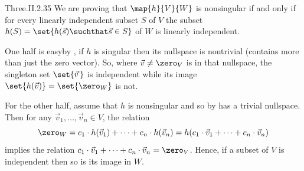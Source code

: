 \begin{ans}{Three.II.2.35}
      We are proving that \( \map{h}{V}{W} \) is nonsingular if and only
      if for every linearly independent subset \( S \) of \( V \) the subset
      \( h(S)=\set{h(\vec{s})\suchthat \vec{s}\in S} \) of \( W \) is linearly
      independent.

      One half is easy\Dash by ,
      if \( h \) is singular then its nullspace is
      nontrivial (contains more than just the zero vector).
      So,
      where \( \vec{v}\neq\zero_V \) is in that nullspace, the singleton set
      \( \set{\vec{v\,}} \) is independent while its image
      \( \set{h(\vec{v})}=\set{\zero_W} \) is not.

      For the other half,
      assume that \( h \) is nonsingular and so by
       has a trivial nullspace.
      Then for any \( \vec{v}_1,\dots,\vec{v}_n\in V \), the relation
      \begin{equation*}
        \zero_W=
        c_1\cdot h(\vec{v}_1)+\dots+c_n\cdot h(\vec{v}_n)
        =h(c_1\cdot \vec{v}_1+\dots+c_n\cdot \vec{v}_n)
      \end{equation*}
      implies the relation
      \( c_1\cdot \vec{v}_1+\dots+c_n\cdot \vec{v}_n=\zero_V \).
      Hence, if a subset of \( V \) is independent then so is its image in
      \( W \).


\end{ans}
